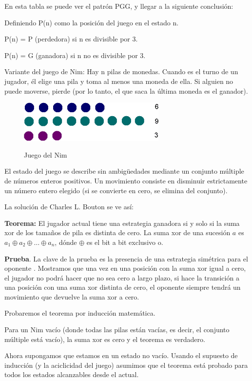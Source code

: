 En esta tabla se puede ver el patrón PGG, y llegar a la siguiente conclusión:

Definiendo P(n) como la posición del juego en el estado n.


P(n) = P (perdedora) si n es divisible por 3.


P(n) = G (ganadora) si n no es divisible por 3.

Variante del juego de Nim: Hay n pilas de monedas. Cuando es el turno de un jugador, él elige una pila y toma al menos una moneda de ella. Si alguien no puede moverse, pierde (por lo tanto, el que saca la última moneda es el ganador).

\begin{figure}
	\centering
	\includegraphics[scale=0.5]{img/juego_nim}
	\label{fig:juegonim}
	\caption{Juego del Nim}
\end{figure}

El estado del juego se describe sin ambigüedades mediante un conjunto múltiple de números enteros positivos. Un movimiento consiste en disminuir estrictamente un número entero elegido (si se convierte en cero, se elimina del conjunto).

La solución de Charles L. Bouton se ve así:

\textbf{Teorema:} El jugador actual tiene una estrategia ganadora si y solo si la suma xor de los tamaños 
de pila es distinta de cero. La suma xor de una sucesión $a$ es $a_1 \oplus a_2 \oplus \ldots \oplus a_n$, dónde $\oplus$ es el bit a bit exclusivo o.

\textbf{Prueba}. La clave de la prueba es la presencia de una estrategia simétrica para el oponente . Mostramos que una vez en una posición con la suma xor igual a cero, el jugador no podrá hacer que no sea cero a largo plazo, si hace la transición a una posición con una suma xor distinta de cero, el oponente siempre tendrá un movimiento que devuelve la suma xor a cero.

Probaremos el teorema por inducción matemática.

Para un Nim vacío (donde todas las pilas están vacías, es decir, el conjunto múltiple está vacío), la suma xor es cero y el teorema es verdadero.

Ahora supongamos que estamos en un estado no vacío. Usando el supuesto de inducción (y la aciclicidad del juego) asumimos que el teorema está probado para todos los estados alcanzables desde el actual.

